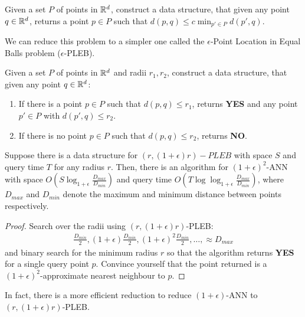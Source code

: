 \documentclass{article}
\begin{document}
\begin{definition}
  Given a set $P$ of points in $\mathbb{R}^d$, construct a data structure, that given any point $q \in \mathbb{R}^d$, returns a point $p \in P$ such that $d(p, q) \leq c \min_{p' \in P} d(p', q)$.
\end{definition}

We can reduce this problem to a simpler one called the $\epsilon$-Point Location in Equal Balls problem ($\epsilon$-PLEB).

\begin{definition}
  Given a set $P$ of points in $\mathbb{R}^d$ and radii $r_1, r_2$, construct a data structure, that given any point $q \in \mathbb{R}^d$:

  \begin{enumerate}
    \item If there is a point $p \in P$ such that $d(p, q) \leq r_1$, returns \textbf{YES} and any point $p' \in P$ with $d(p', q) \leq r_2$.
    \item If there is no point $p \in P$ such that $d(p, q) \leq r_2$, returns \textbf{NO}.
  \end{enumerate}
\end{definition}

\begin{lemma}
  Suppose there is a data structure for $(r, (1 + \epsilon) r)-PLEB$ with space $S$ and query time $T$ for any radius $r$.
  Then, there is an algorithm for $(1 + \epsilon)^2$-ANN with space $O(S \log_{1 + \epsilon} \frac{D_{max}}{D_{min}})$ and query time $O(T \log \log_{1 + \epsilon} \frac{D_{max}}{D_{min}})$, where $D_{max}$ and $D_{min}$ denote the maximum and minimum distance between points respectively.
\end{lemma}

\begin{proof}
  Search over the radii using $(r, (1 + \epsilon) r)$-PLEB:
  \begin{align}
    \frac{D_{min}}{2}, (1+ \epsilon) \frac{D_{min}}{2}, (1 + \epsilon)^2 \frac{D_{min}}{2}, \ldots, \approx D_{max}
  \end{align}
  and binary search for the minimum radius $r$ so that the algorithm returns \textbf{YES} for a single query point $p$.
  Convince yourself that the point returned is a $(1 + \epsilon)^2$-approximate nearest neighbour to $p$.
\end{proof}

In fact, there is a more efficient reduction to reduce $(1 + \epsilon)$-ANN to $(r, (1 + \epsilon) r)$-PLEB.
\end{document}
